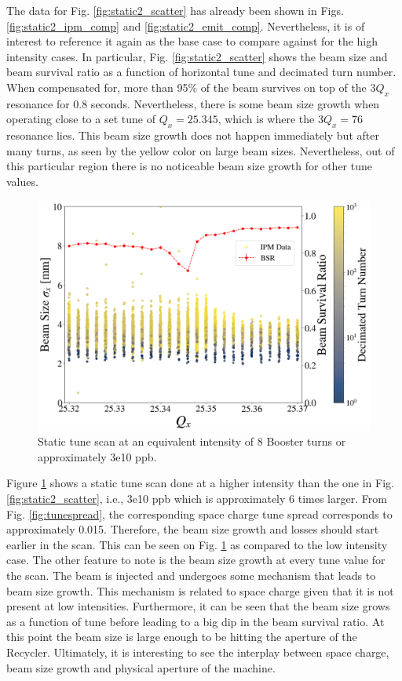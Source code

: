 The data for Fig. \ref{fig:static2_scatter} has already been shown in Figs. \ref{fig:static2_ipm_comp} and \ref{fig:static2_emit_comp}. Nevertheless, it is of interest to reference it again as the base case to compare against for the high intensity cases. In particular, Fig. \ref{fig:static2_scatter} shows the beam size and beam survival ratio as a function of horizontal tune and decimated turn number. When compensated for, more than 95\% of the beam survives on top of the $3Q_x$ resonance for 0.8 seconds. Nevertheless, there is some beam size growth when operating close to a set tune of $Q_x=25.345$, which is where the $3Q_x=76$ resonance lies. This beam size growth does not happen immediately but after many turns, as seen by the yellow color on large beam sizes. Nevertheless, out of this particular region there is no noticeable beam size growth for other tune values.

\begin{figure}[H]
    \centering
    \includegraphics[width=\columnwidth]{chapter6/static8turns_dampersOFF.png}
    \caption{Static tune scan at an equivalent intensity of 8 Booster turns or approximately 3e10 ppb.}
    \label{fig:static8_scatter}
\end{figure}

Figure \ref{fig:static8_scatter} shows a static tune scan done at a higher intensity than the one in Fig. \ref{fig:static2_scatter}, i.e., 3e10 ppb which is approximately 6 times larger. From Fig. \ref{fig:tunespread}, the corresponding space charge tune spread corresponds to approximately 0.015. Therefore, the beam size growth and losses should start earlier in the scan. This can be seen on Fig. \ref{fig:static8_scatter} as compared to the low intensity case. The other feature to note is the beam size growth at every tune value for the scan. The beam is injected and undergoes some mechanism that leads to beam size growth. This mechanism is related to space charge given that it is not present at low intensities. Furthermore, it can be seen that the beam size grows as a function of tune before leading to a big dip in the beam survival ratio. At this point the beam size is large enough to be hitting the aperture of the Recycler. Ultimately, it is interesting to see the interplay between space charge, beam size growth and physical aperture of the machine.      

